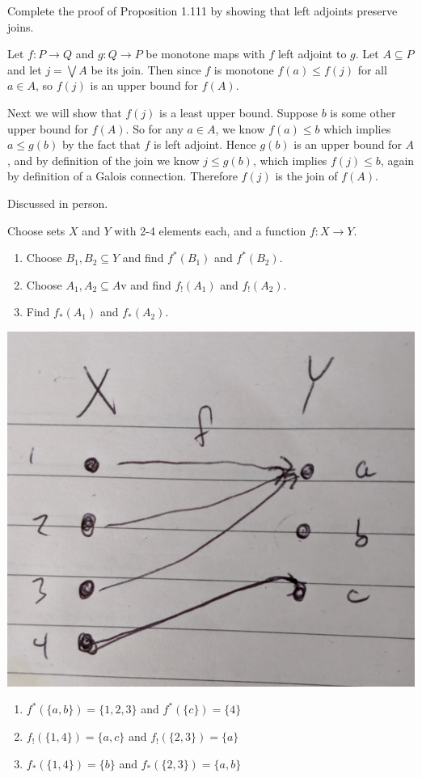 Complete the proof of Proposition 1.111 by showing that left adjoints preserve joins.

\solution
Let $f:P\to Q$ and $g:Q\to P$ be monotone maps with $f$ left adjoint to $g$.  Let $A\subseteq P$ and let $j = \bigvee A$ be its join.  Then since $f$ is monotone $f(a)\leq f(j)$ for all $a\in A$, so $f(j)$ is an upper bound for $f(A)$.

Next we will show that $f(j)$ is a least upper bound.  Suppose $b$ is some other upper bound for $f(A)$.  So for any $a\in A$, we know $f(a)\leq b$ which implies $a\leq g(b)$ by the fact that $f$ is left adjoint.  Hence $g(b)$ is an upper bound for $A$, and by definition of the join we know $j\leq g(b)$, which implies $f(j)\leq b$, again by definition of a Galois connection.  Therefore $f(j)$ is the join of $f(A)$.

Discussed in person.

Choose sets $X$ and $Y$ with 2-4 elements each, and a function $f:X\to Y$.
\begin{enumerate}
	\item Choose $B_1,B_2\subseteq Y$ and find $f^*(B_1)$ and $f^*(B_2)$.
	\item Choose $A_1, A_2\subseteq A$v and find $f_!(A_1)$ and $f_!(A_2)$.
	\item Find $f_*(A_1)$ and $f_*(A_2)$.
\end{enumerate}

\solution
\includegraphics[width=0.5\linewidth]{images/1-118.jpg}
\begin{enumerate}
	\item $f^*(\{a,b\}) = \{1,2,3\}$ and $f^*(\{c\})=\{4\}$
	\item $f_!(\{1,4\}) = \{a,c\}$ and $f_!(\{2,3\})=\{a\}$
	\item $f_*(\{1,4\}) = \{b\}$ and $f_*(\{2,3\})=\{a, b\}$
\end{enumerate}

